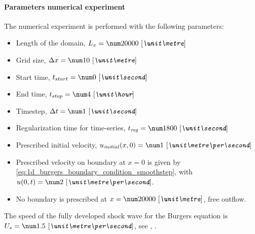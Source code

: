 \paragraph*{Parameters numerical experiment}
The numerical experiment is performed with the following parameters:
\begin{itemize}
    \item Length of the domain, $L_x = \bqty{20000}{\metre}$
    \item Grid size, $\Dx = \bqty{10}{\metre}$
    \item Start time, $t_{start} = \bqty{0}{\second}$
    \item End time, $t_{stop} = \bqty{4}{\hour}$
    \item Timestep, $\Dt = \bqty{1}{\second}$
    \item Regularization time for time-series, $t_{\it reg} = \bqty{1800}{\second}$
    \item Prescribed initial velocity, $u_{\it initial}(x,0) = \bqty{1}{\metre\per\second}$
    \item Prescribed velocity on boundary at $x=0$ is given by \autoref{eq:1d_burgers_boundary_condition_smoothstep}, with $u(0,t) = \bqty{2}{\metre\per\second}$.
    \item No boundary is prescribed at $x=\bqty{20000}{\metre}$, free outflow.
\end{itemize}
The speed of the fully developed shock wave for the Burgers equation is $U_{s} =\bqty{1.5}{\metre\per\second}$, see \citet[eq.\ 8.1.67]{Debnath2008}, \citet[eq.\ 11.23]{LeVeque2002}.
